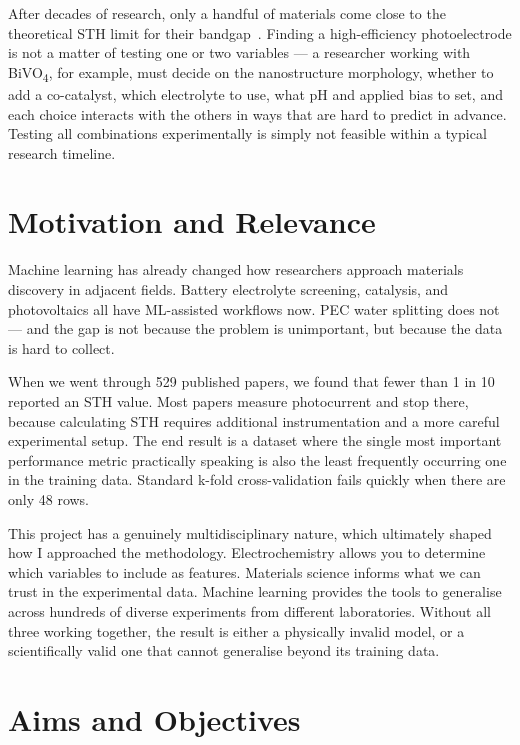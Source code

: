 After decades of research, only a handful of materials come close to the
theoretical STH limit for their bandgap~\cite{walter2010solar}.
Finding a high-efficiency photoelectrode is not a matter of testing one or two
variables --- a researcher working with BiVO\textsubscript{4}, for example,
must decide on the nanostructure morphology, whether to add a co-catalyst,
which electrolyte to use, what pH and applied bias to set, and each choice
interacts with the others in ways that are hard to predict in advance.
Testing all combinations experimentally is simply not feasible within a typical
research timeline.

\section{Motivation and Relevance}

Machine learning has already changed how researchers approach materials discovery
in adjacent fields.
Battery electrolyte screening, catalysis, and photovoltaics all have ML-assisted
workflows now.
PEC water splitting does not --- and the gap is not because the problem is
unimportant, but because the data is hard to collect.

When we went through 529 published papers, we found that fewer than 1 in 10
reported an STH value.
Most papers measure photocurrent and stop there, because calculating STH requires
additional instrumentation and a more careful experimental setup.
The end result is a dataset where the single most important performance metric
practically speaking is also the least frequently occurring one in the training data.
Standard k-fold cross-validation fails quickly when there are only 48 rows.

This project has a genuinely multidisciplinary nature, which ultimately shaped
how I approached the methodology.
Electrochemistry allows you to determine which variables to include as features.
Materials science informs what we can trust in the experimental data.
Machine learning provides the tools to generalise across hundreds of diverse
experiments from different laboratories.
Without all three working together, the result is either a physically invalid model,
or a scientifically valid one that cannot generalise beyond its training data.

\section{Aims and Objectives}

